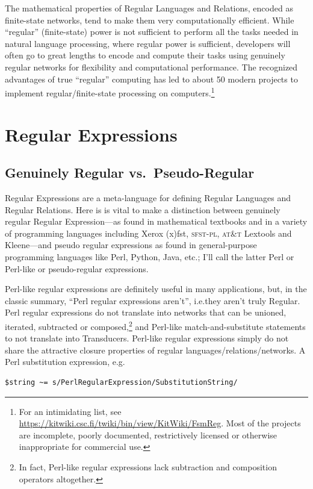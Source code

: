 \documentclass[letterpaper,12pt]{article}
\providecommand{\acro}{}\renewcommand{\acro}{\textsc}
\begin{document}
The mathematical properties of Regular Languages and Relations, encoded as
finite-state networks, tend
to make them very computationally efficient.  While ``regular''
(finite-state) power is not sufficient to perform all
the tasks needed in natural language processing, where regular power is sufficient, developers will often go to great lengths to encode
and compute their tasks using genuinely regular networks for flexibility and computational performance.
The recognized advantages of true ``regular'' computing has led to about 50 modern projects to
implement regular/finite-state processing on
computers.\footnote{For an intimidating list, see
\url{https://kitwiki.csc.fi/twiki/bin/view/KitWiki/FsmReg}.  Most of the
projects are incomplete, poorly documented, restrictively licensed or
otherwise inappropriate for commercial use.}

\section{Regular Expressions}

\subsection{Genuinely Regular vs.~Pseudo-Regular}

Regular Expressions are a meta-language for defining Regular Languages and Regular Relations.  Here is
is vital to make a distinction between genuinely regular Regular Expression---as found in mathematical
textbooks and in a variety of programming languages including Xerox (x)fst, \acro{sfst-pl}, \acro{at\&t} Lextools and
Kleene---and pseudo regular expressions as found in general-purpose programming languages like Perl,
Python, Java, etc.; I'll call the latter Perl or Perl-like or pseudo-regular expressions.  

Perl-like regular expressions are definitely useful in many applications, but, in the classic summary, ``Perl regular
expressions aren't'', i.e.\@ they aren't truly Regular.  Perl regular
expressions do not translate into networks that can be unioned, iterated,
subtracted or composed,\footnote{In fact, Perl-like regular expressions
lack subtraction and composition operators altogether.} and Perl-like
match-and-substitute statements to not translate into
Transducers.  Perl-like regular expressions simply
do not share the attractive closure properties of regular languages/relations/networks.  A
Perl substitution expression, e.g.\@

\begin{Verbatim}[fontsize=\small]
$string ~= s/PerlRegularExpression/SubstitutionString/
\end{Verbatim}
\end{document}
